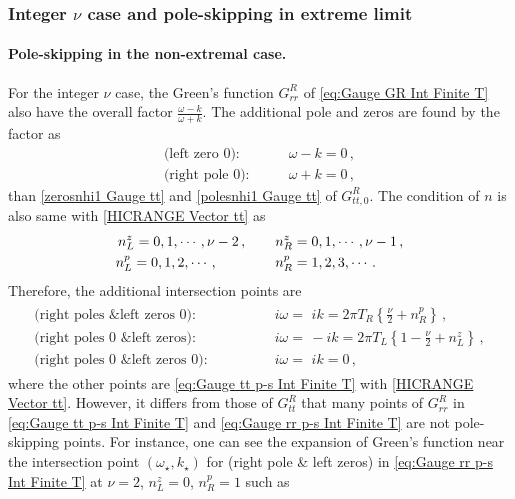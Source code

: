 \documentclass[11pt,a4paper]{article}
\begin{document}
\subsubsection{Integer $\nu$ case and pole-skipping in extreme limit}
\paragraph{Pole-skipping in the non-extremal case.}
For the integer $\nu$ case, the Green's function $G^{R}_{rr}$ of \eqref{eq:Gauge GR Int Finite T} also have the overall factor $\frac{\omega-k}{\omega+k}$. The additional pole and zeros are found by the factor as
\begin{subequations} \label{zerosnhi1 Gauge}
\begin{align}
    \text{(left zero 0):} \qquad & \omega-k=0  \,,\\
    \text{(right pole 0):} \qquad & \omega+k=0 \,,
\end{align}
\end{subequations}
than \eqref{zerosnhi1 Gauge tt} and \eqref{polesnhi1 Gauge tt} of $G^R_{tt,0}$. The condition of $n$ is also same with \eqref{HICRANGE Vector tt} as
\begin{align*}
\begin{split}
n^z_L = 0,1,\cdots, \nu-2 \,,  \qquad \, & n^z_R = 0,1,\cdots, \nu-1 \,,\\
n^p_L = 0,1,2,\cdots \,, \hspace{0.8cm} \qquad
& n^p_R = 1,2,3,\cdots \,.
\end{split}
\end{align*}
Therefore, the additional intersection points are
\begin{align} \label{eq:Gauge rr p-s Int Finite T}
\begin{split}
\text{(right poles \& left zeros 0):} \qquad\qquad & i \omega = \,\, i k = 2 \pi T_R \left\{ \frac{\nu}{2} + n^p_R \right\}\,,
\\
\text{(right poles 0 \& left zeros):} \qquad\qquad & i \omega = \, -i k = 2 \pi T_L \left\{ 1 - \frac{\nu}{2} + n^z_L \right\}\,,
\\
\text{(right poles 0 \& left zeros 0):} \qquad\qquad & i \omega = \,\, i k = 0\,,
\end{split}
\end{align}
where the other points are \eqref{eq:Gauge tt p-s Int Finite T} with \eqref{HICRANGE Vector tt}. However, it differs from those of $G^R_{tt}$ that many points of $G^R_{rr}$ in \eqref{eq:Gauge tt p-s Int Finite T} and \eqref{eq:Gauge rr p-s Int Finite T} are not pole-skipping points. For instance, one can see the expansion of Green's function near the intersection point $(\omega_\star, k_\star)$ for (right pole \& left zeros) in \eqref{eq:Gauge rr p-s Int Finite T} at $\nu=2$, $n^z_L=0$, $n^p_R=1$ such as
\end{document}
